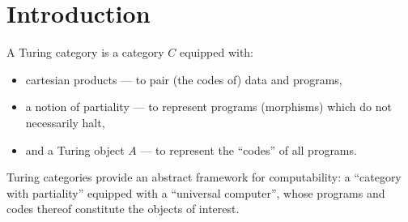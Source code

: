 {}%
\section*{Introduction}


A Turing category is a category $C$ equipped with:
\begin{itemize}
  \item cartesian products --- to pair (the codes of) data and programs,
  \item a notion of partiality --- to represent programs (morphisms)
    which do not necessarily halt,
  \item and a Turing object $A$ --– to represent the ``codes'' of all programs.
\end{itemize}

Turing categories provide an abstract framework for computability:
a ``category with partiality'' equipped with a ``universal computer'',
whose programs and codes thereof constitute the objects of interest.
\cite{AD}
